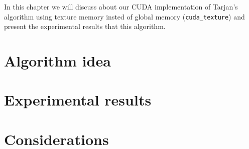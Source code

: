 \label{ch:5}
In this chapter we will discuss about our CUDA implementation of Tarjan's algorithm using texture memory insted of global memory (\verb|cuda_texture|) and present the experimental results that this algorithm.

\section{Algorithm idea}


\section{Experimental results}


\section{Considerations}
